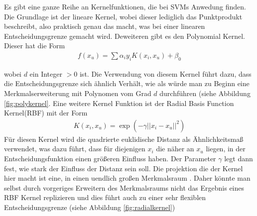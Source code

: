 \documentclass[
]{article}
\begin{document}
Es gibt eine ganze Reihe an Kernelfunktionen, die bei SVMs Anwedung
finden. Die Grundlage ist der lineare Kernel, wobei dieser lediglich das
Punktprodukt beschreibt, also praktisch genau das macht, was bei einer
linearen Entscheidungsgrenze gemacht wird. Deweiteren gibt es den
Polynomial Kernel. Dieser hat die Form \begin{align}
  f(x_u)=\sum \alpha_i y_i K(x_i,x_u)+\beta_0
\end{align}

wobei \(d\) ein Integer \(>0\) ist. Die Verwendung von diesem Kernel
führt dazu, dass die Entscheidungsgrenze sich ähnlich Verhält, wie als
würde man zu Beginn eine Merkmalserweiterung mit Polynomen vom Grad
\(d\) durchführen (siehe Abbildung \ref{fig:polykernel}. Eine weitere
Kernel Funktion ist der Radial Basis Function Kernel(RBF) mit der Form
\begin{align}
K(x_i,x_u)=\exp\left(-\gamma ||x_i-x_u||^2\right)
\end{align} Für diesen Kernel wird die quadrierte euklidische Distanz
als Ähnlichkeitsmaß verwendet, was dazu führt, dass für diejenigen
\(x_i\) die näher an \(x_u\) liegen, in der Entscheidungsfunktion einen
größeren Einfluss haben. Der Parameter \(\gamma\) legt dann fest, wie
stark der Einfluss der Distanz sein soll. Die projektion die der Kernel
hier macht ist eine, in einen uendlich großen Merkmalsraum . Daher
könnte man selbst durch vorgeriges Erweitern des Merkmalsraums nicht das
Ergebnis eines RBF Kernel replizieren und dies führt auch zu einer sehr
flexiblen Entscheidungsgrenze (siehe Abbildung \ref{fig:radialkernel})\\
\end{document}
